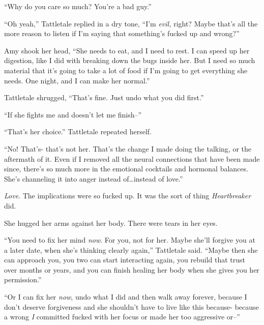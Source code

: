``Why do you care so much?  You're a bad guy.''



``Oh yeah,'' Tattletale replied in a dry tone, ``I'm \emph{evil, }right?  Maybe that's all the more reason to listen if I'm saying that something's fucked up and wrong?''



Amy shook her head, ``She needs to eat, and I need to rest.  I can speed up her digestion, like I did with breaking down the bugs inside her.  But I need so much material that it's going to take a lot of food if I'm going to get everything she needs.  One night, and I can make her normal.''



Tattletale shrugged, ``That's fine.  Just undo what you did first.''



``If she fights me and doesn't let me finish--''



``That's her choice.''  Tattletale repeated herself.



``No!  That's- that's not her.  That's the change I made doing the talking, or the aftermath of it.  Even if I removed all the neural connections that have been made since, there's so much more in the emotional cocktails and hormonal balances.  She's channeling it into anger instead of\ldots instead of love.''



\emph{Love}.  The implications were so fucked up.  It was the sort of thing \emph{Heartbreaker }did.



She hugged her arms against her body.  There were tears in her eyes.



``You need to fix her mind \emph{now}.  For you, not for her.  Maybe she'll forgive you at a later date, when she's thinking clearly again,'' Tattletale said.  ``Maybe then she can approach you, you two can start interacting again, you rebuild that trust over months or years, and you can finish healing her body when she gives you her permission.''



``Or I can fix her \emph{now}, undo what I did and then walk away forever, because I don't deserve forgiveness and she shouldn't have to live like this because- because a wrong \emph{I} committed fucked with her focus or made her too aggressive or--''



